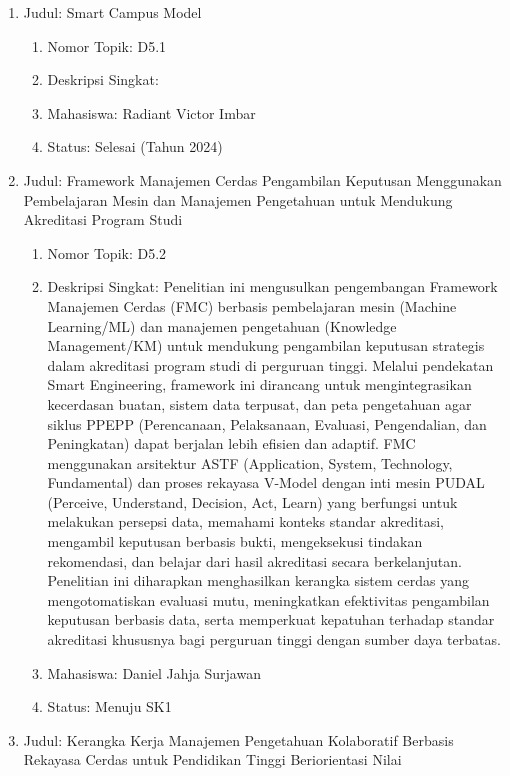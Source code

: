 \documentclass[
  letterpaper,
  DIV=11,
  numbers=noendperiod]{scrreprt}
\providecommand{\tightlist}{%
  \setlength{\itemsep}{0pt}\setlength{\parskip}{0pt}}
\begin{document}
\begin{enumerate}
\def\labelenumi{\arabic{enumi}.}
\tightlist
\item
  Judul: Smart Campus Model

  \begin{enumerate}
  \def\labelenumii{\arabic{enumii}.}
  \tightlist
  \item
    Nomor Topik: D5.1
  \item
    Deskripsi Singkat:
  \item
    Mahasiswa: Radiant Victor Imbar
  \item
    Status: Selesai (Tahun 2024)
  \end{enumerate}
\item
  Judul: Framework Manajemen Cerdas Pengambilan Keputusan Menggunakan
  Pembelajaran Mesin dan Manajemen Pengetahuan untuk Mendukung
  Akreditasi Program Studi

  \begin{enumerate}
  \def\labelenumii{\arabic{enumii}.}
  \tightlist
  \item
    Nomor Topik: D5.2
  \item
    Deskripsi Singkat: Penelitian ini mengusulkan pengembangan Framework
    Manajemen Cerdas (FMC) berbasis pembelajaran mesin (Machine
    Learning/ML) dan manajemen pengetahuan (Knowledge Management/KM)
    untuk mendukung pengambilan keputusan strategis dalam akreditasi
    program studi di perguruan tinggi. Melalui pendekatan Smart
    Engineering, framework ini dirancang untuk mengintegrasikan
    kecerdasan buatan, sistem data terpusat, dan peta pengetahuan agar
    siklus PPEPP (Perencanaan, Pelaksanaan, Evaluasi, Pengendalian, dan
    Peningkatan) dapat berjalan lebih efisien dan adaptif. FMC
    menggunakan arsitektur ASTF (Application, System, Technology,
    Fundamental) dan proses rekayasa V-Model dengan inti mesin PUDAL
    (Perceive, Understand, Decision, Act, Learn) yang berfungsi untuk
    melakukan persepsi data, memahami konteks standar akreditasi,
    mengambil keputusan berbasis bukti, mengeksekusi tindakan
    rekomendasi, dan belajar dari hasil akreditasi secara berkelanjutan.
    Penelitian ini diharapkan menghasilkan kerangka sistem cerdas yang
    mengotomatiskan evaluasi mutu, meningkatkan efektivitas pengambilan
    keputusan berbasis data, serta memperkuat kepatuhan terhadap standar
    akreditasi khususnya bagi perguruan tinggi dengan sumber daya
    terbatas.
  \item
    Mahasiswa: Daniel Jahja Surjawan
  \item
    Status: Menuju SK1
  \end{enumerate}
\item
  Judul: Kerangka Kerja Manajemen Pengetahuan Kolaboratif Berbasis
  Rekayasa Cerdas untuk Pendidikan Tinggi Beriorientasi Nilai


\end{enumerate}
\end{document}
